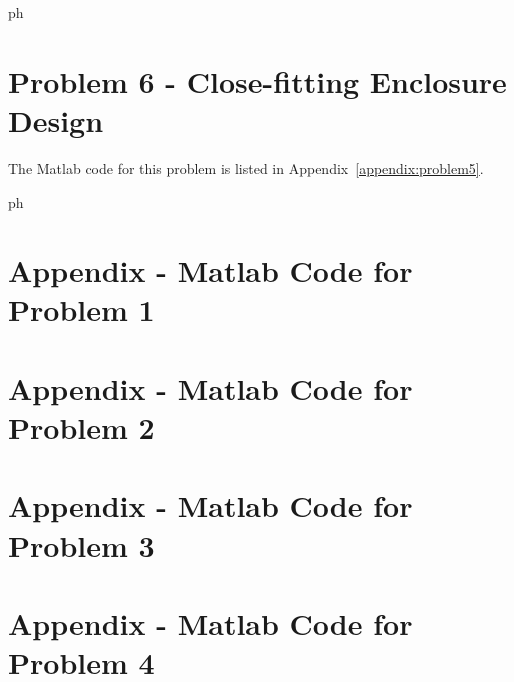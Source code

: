 {{{\vspace{0.25cm}
ph







\newpage
\section*{Problem 6 - Close-fitting Enclosure Design}

The Matlab code for this problem is listed in Appendix~\ref{appendix:problem5}.

\vspace{0.25cm}
ph






\newpage
\section{Appendix - Matlab Code for Problem 1}
\label{appendix:problem1}




\newpage
\section{Appendix - Matlab Code for Problem 2}
\label{appendix:problem2}




\newpage
\section{Appendix - Matlab Code for Problem 3}
\label{appendix:problem3}




\newpage
\section{Appendix - Matlab Code for Problem 4}
\label{appendix:problem4}




}}}
